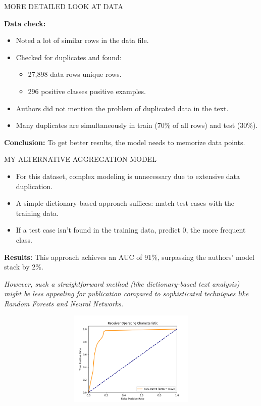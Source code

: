 \documentclass[11pt, aspectratio=169]{beamer}
\begin{document}
\begin{frame}{\MakeUppercase{More detailed look at data}}

    \textbf{Data check:}
    \begin{itemize}
        \item Noted a lot of similar rows in the data file.
        \item Checked for duplicates and found:
        \begin{itemize}
            \item 27,898 data rows  unique rows.
            \item 296 positive classes  positive examples.
        \end{itemize}
        \item Authors did not mention the problem of duplicated data in the text.
        \item Many duplicates are simultaneously in train (70\% of all rows) and test (30\%).
    \end{itemize}

    \textbf{Conclusion:} To get better results, the model needs to memorize data points.

\end{frame}

\begin{frame}{\MakeUppercase{My alternative aggregation model}}
    \begin{itemize}
        \itemsep1em
        \item For this dataset, complex modeling is unnecessary due to extensive data duplication.
        \item A simple dictionary-based approach suffices: match test cases with the training data.
        \item If a test case isn't found in the training data, predict 0, the more frequent class.
    \end{itemize}

    \vspace{0.5cm} %

    \textbf{Results:} This approach achieves an AUC of 91\%, surpassing the authors' model stack by 2\%.

    \vspace{0.5cm} %

    \textit{However, such a straightforward method (like dictionary-based text analysis) might be less appealing for publication compared to sophisticated techniques like Random Forests and Neural Networks.}

    \includegraphics[width=14cm,height=4.5cm]{output/fake_model_roc_curve}
\end{frame}
\end{document}
